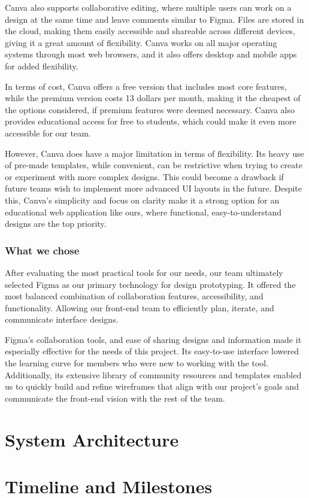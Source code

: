 \documentclass[12pt]{article}
\begin{document}
Canva also supports collaborative editing, where multiple users can work on a design at the same time and leave comments similar to Figma. Files are stored in the cloud, making them easily accessible and shareable across different devices, giving it a great amount of flexibility. Canva works on all major operating systems through most web browsers, and it also offers desktop and mobile apps for added flexibility.

In terms of cost, Canva offers a free version that includes most core features, while the premium version costs 13 dollars per month, making it the cheapest of the options considered, if premium features were deemed necessary. Canva also provides educational access for free to students, which could make it even more accessible for our team.

However, Canva does have a major limitation in terms of flexibility. Its heavy use of pre-made templates, while convenient, can be restrictive when trying to create or experiment with more complex designs. This could become a drawback if future teams wish to implement more advanced UI layouts in the future. Despite this, Canva’s simplicity and focus on clarity make it a strong option for an educational web application like ours, where functional, easy-to-understand designs are the top priority.

\subsubsection{What we chose}
After evaluating the most practical tools for our needs, our team ultimately selected Figma as our primary technology for design prototyping. It offered the most balanced combination of collaboration features, accessibility, and functionality. Allowing our front-end team to efficiently plan, iterate, and communicate interface designs.

Figma’s collaboration tools, and ease of sharing designs and information made it especially effective for the needs of this project. Its easy-to-use interface lowered the learning curve for members who were new to working with the tool. Additionally, its extensive library of community resources and templates enabled us to quickly build and refine wireframes that align with our project’s goals and communicate the front-end vision with the rest of the team.
\section{System Architecture}


\section{Timeline and Milestones}
\end{document}
